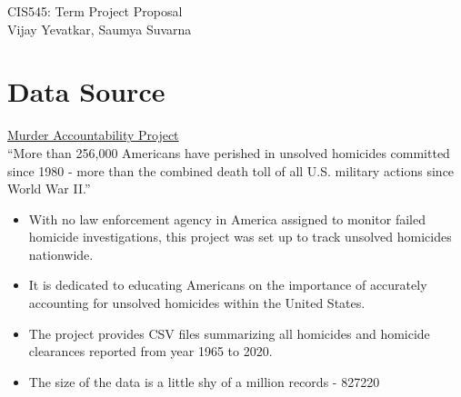 \documentclass{article}
\begin{document}
\begingroup  
  \centering
  \LARGE CIS545: Term Project Proposal\\[1.5em]
  \large Vijay Yevatkar, Saumya Suvarna\par
\endgroup
\section{Data Source}
\href{http://www.murderdata.org/}{Murder Accountability Project}\\
“More than 256,000 Americans have perished in unsolved homicides committed since 1980 - more than the combined death toll of all U.S. military actions since World War II.”
\begin{itemize}
    \item With no law enforcement agency in America assigned to monitor failed homicide investigations, this project was set up to track unsolved homicides nationwide. 
    \item It is dedicated to educating Americans on the importance of accurately accounting for unsolved homicides within the United States. 
    \item The project provides CSV files summarizing all homicides and homicide clearances reported from year 1965 to 2020.
    \item The size of the data is a little shy of a million records - 827220
\end{itemize}
\end{document}
